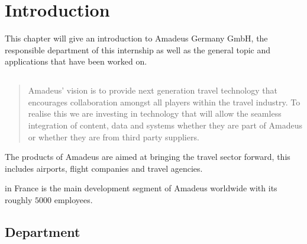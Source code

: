 \chapter{Introduction}

This  chapter  will  give  an  introduction  to  Amadeus  Germany  GmbH,  the  responsible
department  of  this  internship  as  well  as  the  general  topic  and  applications  that  have
been worked on.

\section{\amadeus}

\begin{quote}
Amadeus' vision is to provide next generation travel technology that encourages collaboration amongst all players within the travel industry. To realise this we are investing in technology that will allow the seamless integration of content, data and systems whether they are part of Amadeus or whether they are from third party suppliers.
\hfill\cite{amadeus2014}
\end{quote}

The products of Amadeus are aimed at bringing the travel sector forward, this includes airports, flight companies and travel agencies.

\amadeus in France is the main development segment of Amadeus worldwide with its roughly $5000$ employees.

\section{Department}

\lipsum
